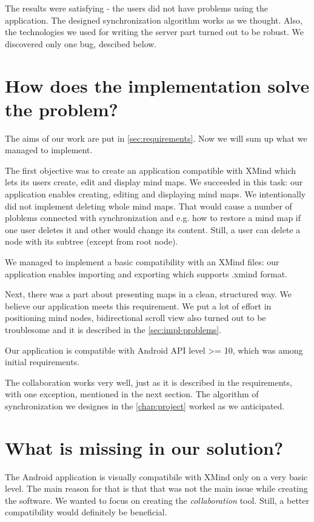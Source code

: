 The results were satisfying - the users did not have problems using the application. The designed synchronization algorithm works as we thought. Also, the technologies we used for writing the server part turned out to be robust. We discovered only one bug, descibed below. 

\section{How does the implementation solve the problem?}
\label{sec:summary-how-solve}
The aims of our work are put in \cref{sec:requirements}. Now we will sum up what we managed to implement. 
 
The first objective was to create an application compatible with XMind which lets its users create, edit and display mind maps. We succeeded in this task: our application enables creating, editing and displaying mind maps. 
We intentionally did not implement deleting whole mind maps. That would cause a number of ploblems connected with synchronization and e.g. how to restore a mind map if one user deletes it and other would change its content. Still, a user can delete a node with its subtree (except from root node).

We managed to implement a basic compatibility with an XMind files: our application enables importing and exporting which supports .xmind format. 

Next, there was a part about presenting maps in a clean, structured way. We believe our application meets this requirement. We put a lot of effort in positioning mind nodes, bidirectional scroll view also turned out to be troublesome and it is described in the \cref{sec:impl-problems}.

Our application is compatible with Android API level >= 10, which was among initial requirements.

The collaboration works very well, just as it is described in the requirements, with one exception, mentioned in the next section. The algorithm of synchronization we designes in the \cref{chap:project} worked  as we anticipated. 

\section{What is missing in our solution?}
\label{sec:summary-missing}
The Android application is visually compatibile with XMind only on a very basic level. The main reason for that is that that was not the main issue while creating the software. We wanted to focus on creating the \emph{collaboration} tool. Still, a better compatibility would definitely be beneficial. 

